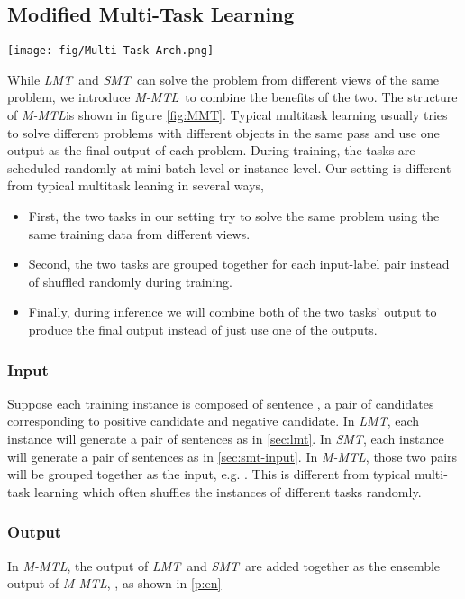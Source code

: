 \documentclass[11pt,a4paper]{article}
\newcommand{\lmt}{\textit{LMT}}
\newcommand{\smt}{\textit{SMT}}
\newcommand{\mmt}{\textit{M-MTL}}
\begin{document}
\subsection{Modified Multi-Task Learning}
\label{sec:mmt}

\begin{figure*}[ht!]
	\centering
{
	\texttt{[image: fig/Multi-Task-Arch.png]}
    }
\caption{Multi-Task Architecture}
\label{fig:MMT}
\end{figure*}

While \lmt~and \smt~can solve the problem from different views of the same problem, we introduce \mmt~to combine the benefits of the two.
The structure of \mmt is shown in figure \ref{fig:MMT}. Typical multitask learning usually tries to solve different problems with different objects in the same pass and use one output as the final output of each problem. During training, the tasks are scheduled randomly at mini-batch level or instance level. Our setting is different from typical multitask leaning in several ways,
\begin{itemize}
    \item First, the two tasks in our setting try to solve the same problem using the same training data from different views. 
    \item Second, the two tasks are grouped together for each input-label pair instead of shuffled randomly during training. 
    \item Finally, during inference we will combine both of the two tasks' output to produce the final output instead of just use one of the outputs.
\end{itemize}
\subsubsection{Input}
Suppose each training instance is composed of sentence , a pair of candidates  corresponding to positive candidate and negative candidate. In \lmt, each instance will generate a pair of sentences  as in \ref{sec:lmt}. In \smt, each instance will generate a pair of sentences  as in \ref{sec:smt-input}. In \mmt, those two pairs will be grouped together as the input, e.g. . This is different from typical multi-task learning which often shuffles the instances of different tasks randomly.

\subsubsection{Output}
In \mmt, the output of \lmt~and \smt~are added together as the ensemble output of \mmt, , as shown in \eqref{p:en}
\end{document}
